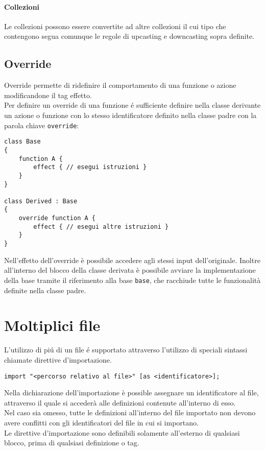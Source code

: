 \paragraph{Collezioni}
Le collezioni possono essere convertite ad altre collezioni il cui tipo che contengono segua 
comunque le regole di upcasting e downcasting sopra definite. 

\subsection{Override}
Override permette di ridefinire il comportamento di una funzione o azione modificandone
il tag effetto. \\ 
Per definire un override di una funzione é sufficiente definire nella classe derivante
un azione o funzione con lo stesso identificatore definito nella classe padre con la 
parola chiave \lstinline|override|:
\begin{lstlisting}
class Base 
{
    function A { 
        effect { // esegui istruzioni } 
    }
}

class Derived : Base
{
    override function A { 
        effect { // esegui altre istruzioni }
    }
}
\end{lstlisting}
Nell'effetto dell'override è possibile accedere agli stessi input dell'originale. 
Inoltre all'interno del blocco della classe derivata è possibile avviare la implementazione 
della base tramite il riferimento alla base \lstinline|base|, che racchiude
tutte le funzionalità definite nella classe padre. 

\section{Moltiplici file} \label{MultipleFiles}
L'utilizzo di piú di un file é supportato attraverso l'utilizzo di speciali sintassi
chiamate direttive d'importazione. 
\begin{lstlisting}
import "<percorso relativo al file>" [as <identificatore>];
\end{lstlisting}
Nella dichiarazione dell'importazione è possible assegnare un identificatore al file, 
attraverso il quale si accederà alle definizioni contenute all'interno di esso. \\
Nel caso sia omesso, tutte le definizioni all'interno del file importato non devono avere
conflitti con gli identificatori del file in cui si importano. \\
Le direttive d'importazione sono definibili solamente all'esterno di qualsiasi blocco,
prima di qualsiasi definizione o tag. 

